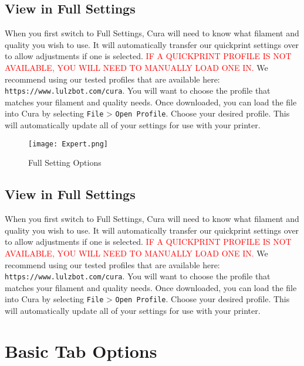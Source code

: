 \subsection{View in Full Settings}
When you first switch to Full Settings, Cura will need to know what filament and quality you wish to use. It will automatically transfer our quickprint settings over to allow adjustments if one is selected. \textcolor{red}{IF A QUICKPRINT PROFILE IS NOT AVAILABLE, YOU WILL NEED TO MANUALLY LOAD ONE IN.} We recommend using our tested profiles that are available here: \texttt{https://www.lulzbot.com/cura}. You will want to choose the profile that matches your filament and quality needs. Once downloaded, you can load the file into Cura by selecting \texttt{File} > \texttt{Open Profile}. Choose your desired profile. This will automatically update all of your settings for use with your printer.
\begin{figure}[hbt]
\centering
\texttt{[image: Expert.png]}
\caption{Full Setting Options}
\label{fig:Expert Options}
\end{figure}

\subsection{View in Full Settings}
When you first switch to Full Settings, Cura will need to know what filament and quality you wish to use. It will automatically transfer our quickprint settings over to allow adjustments if one is selected. \textcolor{red}{IF A QUICKPRINT PROFILE IS NOT AVAILABLE, YOU WILL NEED TO MANUALLY LOAD ONE IN.} We recommend using our tested profiles that are available here: \texttt{https://www.lulzbot.com/cura}. You will want to choose the profile that matches your filament and quality needs. Once downloaded, you can load the file into Cura by selecting \texttt{File} > \texttt{Open Profile}. Choose your desired profile. This will automatically update all of your settings for use with your printer.

\section{Basic Tab Options}

